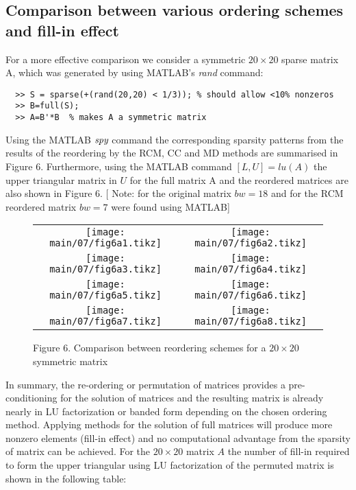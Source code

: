   
  \subsection{Comparison between various ordering schemes and fill-in effect}
  For a more effective comparison we consider a symmetric $20 \times 20$ sparse
  matrix A, which was generated by using MATLAB's {\it{rand}} command:
  \begin{lstlisting}
  >> S = sparse(+(rand(20,20) < 1/3)); % should allow <10% nonzeros
  >> B=full(S);
  >> A=B'*B  % makes A a symmetric matrix
  \end{lstlisting}
  
  Using the MATLAB $\emph{spy}$ command the corresponding sparsity patterns from
  the results of the reordering by the RCM, CC and MD methods are summarised in
  Figure 6.  Furthermore, using the MATLAB command $[L,U] = lu(A)$ the upper
  triangular matrix in $U$ for the full matrix A and the reordered matrices are
  also shown in Figure 6. [ Note: for the original matrix $bw =18$ and for the RCM
  reordered matrix $bw =7$ were found using MATLAB]
  \newpage
  
  \begin{figure}[H]
    \begin{center}
      \begin{tabular}{cc}
        \scriptsize\texttt{[image: main/07/fig6a1.tikz]} &
        \scriptsize\texttt{[image: main/07/fig6a2.tikz]}\\
        \scriptsize\texttt{[image: main/07/fig6a3.tikz]} &
        \scriptsize\texttt{[image: main/07/fig6a4.tikz]}\\
        \scriptsize\texttt{[image: main/07/fig6a5.tikz]} &
        \scriptsize\texttt{[image: main/07/fig6a6.tikz]}\\
        \scriptsize\texttt{[image: main/07/fig6a7.tikz]} &
        \scriptsize\texttt{[image: main/07/fig6a8.tikz]}\\
      \end{tabular}
    \end{center}
    Figure 6. Comparison between reordering schemes for a $20 \times 20$ symmetric matrix
  \end{figure}
  \vskip 10pt
  \noindent
  
  In summary, the re-ordering or permutation of matrices provides a
  pre-conditioning for the solution of matrices and the resulting matrix is
  already nearly in LU factorization or banded form depending on the chosen
  ordering method. Applying methods for the solution of full matrices will produce
  more nonzero elements (fill-in effect) and no computational advantage from the
  sparsity of matrix can be achieved.
  \vskip 10pt
  \noindent
  For the $20 \times 20$ matrix $A$ the number of fill-in required to form the
  upper triangular using LU factorization of the permuted matrix is shown in the
  following table:
  

